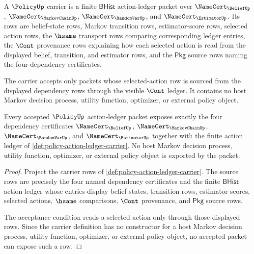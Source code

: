 \begin{definition}
\label{def:policy-action-ledger-carrier}
A $\PolicyUp$ carrier is a finite $\mathsf{BHist}$ action-ledger packet over
$\NameCert_{\BeliefUp}$, $\NameCert_{\MarkovChainUp}$,
$\NameCert_{\RandomVarUp}$, and $\NameCert_{\EstimatorUp}$. Its rows are
belief-state rows, Markov transition rows, estimator-score rows, selected
action rows, the $\hsame$ transport rows comparing corresponding ledger
entries, the $\Cont$ provenance rows explaining how each selected action is
read from the displayed belief, transition, and estimator rows, and the
$\mathsf{Pkg}$ source rows naming the four dependency certificates.

The carrier accepts only packets whose selected-action row is sourced from the
displayed dependency rows through the visible $\Cont$ ledger. It contains no
host Markov decision process, utility function, optimizer, or external policy
object.
\end{definition}
\begin{theorem}
\label{thm:policy-tastegate-source-scope}
Every accepted $\PolicyUp$ action-ledger packet exposes exactly the four
dependency certificates $\NameCert_{\BeliefUp}$,
$\NameCert_{\MarkovChainUp}$, $\NameCert_{\RandomVarUp}$, and
$\NameCert_{\EstimatorUp}$ together with the finite action ledger of
\autoref{def:policy-action-ledger-carrier}. No host Markov decision process,
utility function, optimizer, or external policy object is exported by the
packet.
\end{theorem}
\begin{proof}
Project the carrier rows of
\autoref{def:policy-action-ledger-carrier}. The source rows are precisely the
four named dependency certificates and the finite $\mathsf{BHist}$ action
ledger whose entries display belief states, transition rows, estimator scores,
selected actions, $\hsame$ comparisons, $\Cont$ provenance, and
$\mathsf{Pkg}$ source rows.

The acceptance condition reads a selected action only through those displayed
rows. Since the carrier definition has no constructor for a host Markov
decision process, utility function, optimizer, or external policy object, no
accepted packet can expose such a row.
\end{proof}

